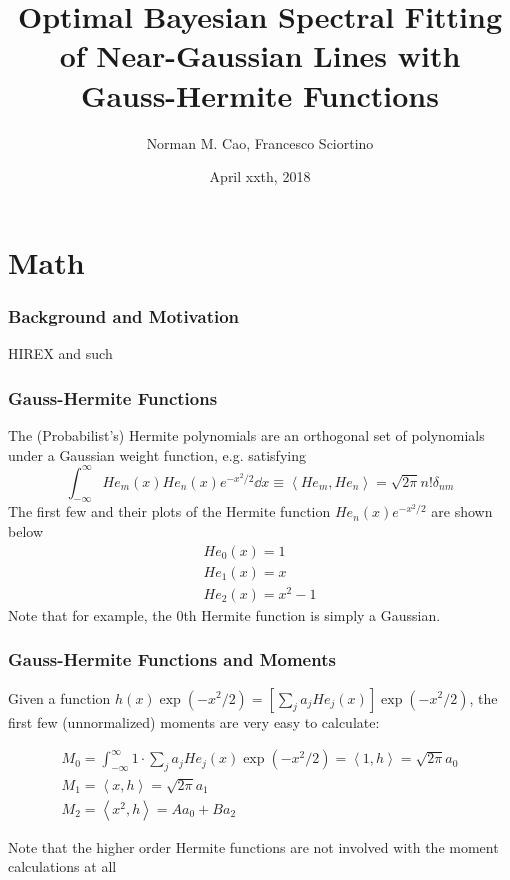 \documentclass{beamer}
\begin{document}
\title[BSFC]{Optimal Bayesian Spectral Fitting of Near-Gaussian Lines with Gauss-Hermite Functions}

\author[N.M. Cao and F. Sciortino]{Norman M. Cao, Francesco Sciortino}
\date{April xxth, 2018}

\begin{frame}
	\titlepage
\end{frame}

\section{Math}

\begin{frame}
	\frametitle{Background and Motivation}
	HIREX and such
\end{frame}

\begin{frame}
	\frametitle{Gauss-Hermite Functions}
	The (Probabilist's) Hermite polynomials are an orthogonal set of polynomials under a Gaussian weight function, e.g. satisfying
	\begin{equation}
	\int_{-\infty}^{\infty} He_m(x) He_n(x) e^{-x^2/2} \dd{x} \equiv \left< He_m, He_n \right> = \sqrt{2 \pi} n! \delta_{nm}
	\end{equation}
	The first few and their plots of the Hermite function \(He_n(x) e^{-x^2/2}\) are shown below
	\begin{equation}
	\begin{gathered}
	He_0(x) = 1 \\
	He_1(x) = x \\
	He_2(x) = x^2-1
	\end{gathered}
	\end{equation}
	Note that for example, the 0th Hermite function is simply a Gaussian.
\end{frame}

\begin{frame}
	\frametitle{Gauss-Hermite Functions and Moments}
	Given a function \(h(x) \exp(-x^2/2) = \left[\sum_j a_j He_j(x)\right] \exp(-x^2/2)\), the first few (unnormalized) moments are very easy to calculate:
	
	\begin{equation}
	\begin{gathered}
	M_0 = \int_{-\infty}^{\infty} 1 \cdot \sum_j a_j He_j(x) \exp(-x^2/2) = \left< 1, h \right> = \sqrt{2\pi} a_0 \\
	M_1 = \left< x, h \right> = \sqrt{2 \pi}a_1 \\
	M_2 = \left< x^2, h \right> = A a_0 + B a_2
	\end{gathered}
	\end{equation}
	
	Note that the higher order Hermite functions are not involved with the moment calculations at all
\end{frame}
\end{document}

